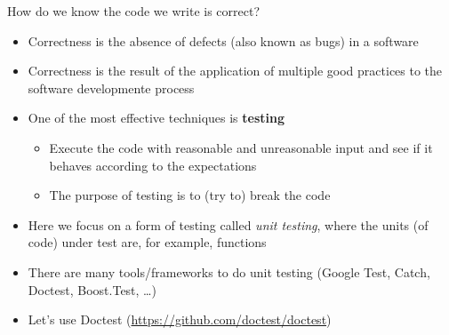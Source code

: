 \begin{frame}[fragile]{How do we know the code we write is correct?}

  \begin{itemize}[<+->]
  \item Correctness is the absence of defects (also known as bugs) in a software
  \item Correctness is the result of the application of multiple good practices
    to the software developmente process
  \item One of the most effective techniques is \textbf{testing}
    \begin{itemize}
    \item Execute the code with reasonable and unreasonable input and see if it
      behaves according to the expectations
    \item The purpose of testing is to (try to) \alert{break} the code
    \end{itemize}
  \end{itemize}


  \begin{itemize}[<+->]
  \item Here we focus on a form of testing called \textit{unit testing}, where
    the units (of code) under test are, for example, functions
  \item There are many tools/frameworks to do unit testing (Google Test, Catch,
    Doctest, Boost.Test, \ldots)
  \item Let's use Doctest (\url{https://github.com/doctest/doctest})
  \end{itemize}

\end{frame}

